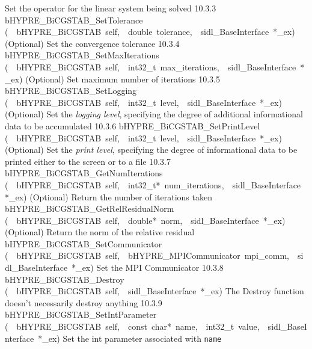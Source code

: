 \documentclass{article}
\begin{document}
\begin{cxxentry}
\begin{cxxentry}
\begin{cxxnames}
        {
Set the operator for the linear system being solved}
        {10.3.3}
        {bHYPRE\_BiCGSTAB\_SetTolerance}
        {(\ \ bHYPRE\_BiCGSTAB\ self,\ \ double\ tolerance,\ \ sidl\_BaseInterface\ *\_ex)}
        {
(Optional) Set the convergence tolerance}
        {10.3.4}
        {bHYPRE\_BiCGSTAB\_SetMaxIterations}
        {(\ \ bHYPRE\_BiCGSTAB\ self,\ \ int32\_t\ max\_iterations,\ \ sidl\_BaseInterface\ *\_ex)}
        {
(Optional) Set maximum number of iterations}
        {10.3.5}
        {bHYPRE\_BiCGSTAB\_SetLogging}
        {(\ \ bHYPRE\_BiCGSTAB\ self,\ \ int32\_t\ level,\ \ sidl\_BaseInterface\ *\_ex)}
        {
(Optional) Set the {\it logging level}, specifying the degree
of additional informational data to be accumulated}
        {10.3.6}
        {bHYPRE\_BiCGSTAB\_SetPrintLevel}
        {(\ \ bHYPRE\_BiCGSTAB\ self,\ \ int32\_t\ level,\ \ sidl\_BaseInterface\ *\_ex)}
        {
(Optional) Set the {\it print level}, specifying the degree
of informational data to be printed either to the screen or
to a file}
        {10.3.7}
        {bHYPRE\_BiCGSTAB\_GetNumIterations}
        {(\ \ bHYPRE\_BiCGSTAB\ self,\ \ int32\_t*\ num\_iterations,\ \ sidl\_BaseInterface\ *\_ex)}
        {
(Optional) Return the number of iterations taken}
        {}
\label{cxx.10.3.18}
        {bHYPRE\_BiCGSTAB\_GetRelResidualNorm}
        {(\ \ bHYPRE\_BiCGSTAB\ self,\ \ double*\ norm,\ \ sidl\_BaseInterface\ *\_ex)}
        {
(Optional) Return the norm of the relative residual}
        {}
\label{cxx.10.3.19}
        {bHYPRE\_BiCGSTAB\_SetCommunicator}
        {(\ \ bHYPRE\_BiCGSTAB\ self,\ \ bHYPRE\_MPICommunicator\ mpi\_comm,\ \ sidl\_BaseInterface\ *\_ex)}
        {
Set the MPI Communicator}
        {10.3.8}
        {bHYPRE\_BiCGSTAB\_Destroy}
        {(\ \ bHYPRE\_BiCGSTAB\ self,\ \ sidl\_BaseInterface\ *\_ex)}
        {
The Destroy function doesn't necessarily destroy anything}
        {10.3.9}
        {bHYPRE\_BiCGSTAB\_SetIntParameter}
        {(\ \ bHYPRE\_BiCGSTAB\ self,\ \ const\ char*\ name,\ \ int32\_t\ value,\ \ sidl\_BaseInterface\ *\_ex)}
        {
Set the int parameter associated with {\tt name}}
        {}
\label{cxx.10.3.20}

\end{cxxnames}
\end{cxxentry}
\end{cxxentry}
\end{document}
